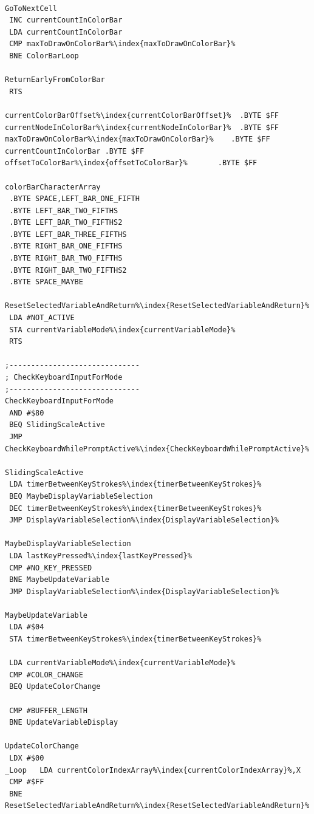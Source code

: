 \begin{minipage}[b]{0.33\linewidth}
\begin{lrbox}{\mybox}%
\begin{lstlisting}[basicstyle=\ttfamily\tiny,escapechar=\%]

GoToNextCell
 INC currentCountInColorBar
 LDA currentCountInColorBar
 CMP maxToDrawOnColorBar%\index{maxToDrawOnColorBar}%
 BNE ColorBarLoop

ReturnEarlyFromColorBar
 RTS

currentColorBarOffset%\index{currentColorBarOffset}%  .BYTE $FF
currentNodeInColorBar%\index{currentNodeInColorBar}%  .BYTE $FF
maxToDrawOnColorBar%\index{maxToDrawOnColorBar}%    .BYTE $FF
currentCountInColorBar .BYTE $FF
offsetToColorBar%\index{offsetToColorBar}%       .BYTE $FF

colorBarCharacterArray
 .BYTE SPACE,LEFT_BAR_ONE_FIFTH
 .BYTE LEFT_BAR_TWO_FIFTHS
 .BYTE LEFT_BAR_TWO_FIFTHS2
 .BYTE LEFT_BAR_THREE_FIFTHS
 .BYTE RIGHT_BAR_ONE_FIFTHS
 .BYTE RIGHT_BAR_TWO_FIFTHS
 .BYTE RIGHT_BAR_TWO_FIFTHS2
 .BYTE SPACE_MAYBE

ResetSelectedVariableAndReturn%\index{ResetSelectedVariableAndReturn}%
 LDA #NOT_ACTIVE
 STA currentVariableMode%\index{currentVariableMode}%
 RTS

;------------------------------
; CheckKeyboardInputForMode
;------------------------------
CheckKeyboardInputForMode
 AND #$80
 BEQ SlidingScaleActive
 JMP CheckKeyboardWhilePromptActive%\index{CheckKeyboardWhilePromptActive}%

SlidingScaleActive
 LDA timerBetweenKeyStrokes%\index{timerBetweenKeyStrokes}%
 BEQ MaybeDisplayVariableSelection
 DEC timerBetweenKeyStrokes%\index{timerBetweenKeyStrokes}%
 JMP DisplayVariableSelection%\index{DisplayVariableSelection}%

MaybeDisplayVariableSelection
 LDA lastKeyPressed%\index{lastKeyPressed}%
 CMP #NO_KEY_PRESSED
 BNE MaybeUpdateVariable
 JMP DisplayVariableSelection%\index{DisplayVariableSelection}%

MaybeUpdateVariable
 LDA #$04
 STA timerBetweenKeyStrokes%\index{timerBetweenKeyStrokes}%

 LDA currentVariableMode%\index{currentVariableMode}%
 CMP #COLOR_CHANGE
 BEQ UpdateColorChange

 CMP #BUFFER_LENGTH
 BNE UpdateVariableDisplay

UpdateColorChange
 LDX #$00
_Loop   LDA currentColorIndexArray%\index{currentColorIndexArray}%,X
 CMP #$FF
 BNE ResetSelectedVariableAndReturn%\index{ResetSelectedVariableAndReturn}%


\end{lstlisting}
\end{lrbox}
\end{minipage}
